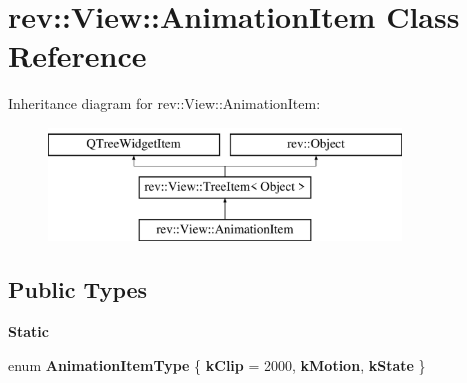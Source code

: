 \hypertarget{classrev_1_1_view_1_1_animation_item}{}\section{rev\+::View\+::Animation\+Item Class Reference}
\label{classrev_1_1_view_1_1_animation_item}
Inheritance diagram for rev\+::View\+::Animation\+Item\+:\begin{figure}[H]
\begin{center}
\leavevmode
\includegraphics[height=3.000000cm]{classrev_1_1_view_1_1_animation_item}
\end{center}
\end{figure}
\subsection*{Public Types}
\begin{Indent}\textbf{ Static}\par
\begin{DoxyCompactItemize}
\item 
\mbox{\label{classrev_1_1_view_1_1_animation_item_a7b137ce077e3e66baa8c868e31232be4}} 
enum {\bfseries Animation\+Item\+Type} \{ {\bfseries k\+Clip} = 2000, 
{\bfseries k\+Motion}, 
{\bfseries k\+State}
 \}
\end{DoxyCompactItemize}
\end{Indent}
